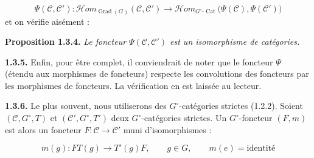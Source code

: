 \begin{equation}
  \Psi(\mathcal C,\mathcal C')\colon
  \mathcal{H}\!om_{\operatorname{Grad}(G)}(\mathcal C,\mathcal C')
  \longrightarrow
  \mathcal{H}\!om_{G^\circ\text{-}\operatorname{Cat}}
    \bigl(\Psi(\mathcal C),\Psi(\mathcal C')\bigr)
  \tag{1.3.3.3}
\end{equation}
et on vérifie aisément :

\noindent\textbf{Proposition 1.3.4.}\quad
\emph{Le foncteur $\Psi(\mathcal C,\mathcal C')$ est un isomorphisme de
catégories.}

\noindent\textbf{1.3.5.}\quad
Enfin, pour être complet, il conviendrait de noter que le foncteur
$\Psi$ (étendu aux morphismes de foncteurs) respecte les convolutions des
foncteurs par les morphismes de foncteurs. La vérification en est laissée
au lecteur.

\noindent\textbf{1.3.6.}\quad
Le plus souvent, nous utiliserons des $G^\circ$-catégories strictes
(1.2.2). Soient $(\mathcal C,G^\circ,T)$ et
$(\mathcal C',G^\circ,T')$ deux $G^\circ$-catégories strictes. Un
$G^\circ$-foncteur $(F,m)$ est alors un foncteur
$F\colon\mathcal C\to\mathcal C'$ muni d'isomorphismes :

\begin{equation}
  m(g)\colon FT(g)\longrightarrow T'(g)F,
  \qquad g\in G,
  \qquad m(e)=\text{identité}
  \tag{1.3.6.1}
\end{equation}
